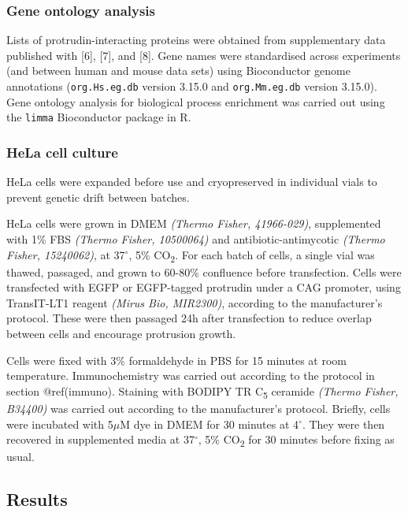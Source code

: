 \documentclass[
  12pt,
  a4paper,
]{article}
\begin{document}
\hypertarget{gene-ontology-analysis}{%
\subsubsection{Gene ontology analysis}\label{gene-ontology-analysis}}

Lists of protrudin-interacting proteins were obtained from supplementary
data published with {[}6{]}, {[}7{]}, and {[}8{]}. Gene names were
standardised across experiments (and between human and mouse data sets)
using Bioconductor genome annotations (\texttt{org.Hs.eg.db} version
3.15.0 and \texttt{org.Mm.eg.db} version 3.15.0). Gene ontology analysis
for biological process enrichment was carried out using the
\texttt{limma} Bioconductor package in R.

\hypertarget{hela-cell-culture}{%
\subsubsection{HeLa cell culture}\label{hela-cell-culture}}

HeLa cells were expanded before use and cryopreserved in individual
vials to prevent genetic drift between batches.

HeLa cells were grown in DMEM \emph{(Thermo Fisher, 41966-029)},
supplemented with 1\% FBS \emph{(Thermo Fisher, 10500064)} and
antibiotic-antimycotic \emph{(Thermo Fisher, 15240062)}, at
37\(^{\circ}\), 5\% CO\textsubscript{2}. For each batch of cells, a
single vial was thawed, passaged, and grown to 60-80\% confluence before
transfection. Cells were transfected with EGFP or EGFP-tagged protrudin
under a CAG promoter, using TransIT-LT1 reagent \emph{(Mirus Bio,
MIR2300)}, according to the manufacturer's protocol. These were then
passaged 24h after transfection to reduce overlap between cells and
encourage protrusion growth.

Cells were fixed with 3\% formaldehyde in PBS for 15 minutes at room
temperature. Immunochemistry was carried out according to the protocol
in section @ref(immuno). Staining with BODIPY TR C\textsubscript{5}
ceramide \emph{(Thermo Fisher, B34400)} was carried out according to the
manufacturer's protocol. Briefly, cells were incubated with 5\(\mu\)M
dye in DMEM for 30 minutes at 4\(^{\circ}\). They were then recovered in
supplemented media at 37\(^{\circ}\), 5\% CO\textsubscript{2} for 30
minutes before fixing as usual.

\hypertarget{results}{%
\subsection{Results}\label{results}}
\end{document}
